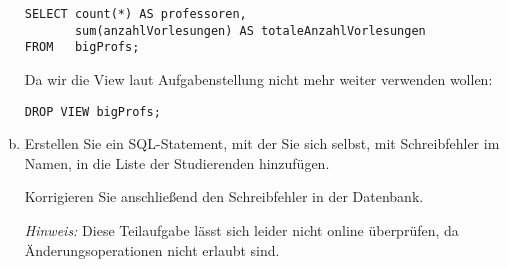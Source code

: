 \begin{normalText}
\begin{enumerate}[a)]
\begin{note}
	\begin{lstlisting}
SELECT count(*) AS professoren,
       sum(anzahlVorlesungen) AS totaleAnzahlVorlesungen
FROM   bigProfs;
	\end{lstlisting}

	Da wir die View laut Aufgabenstellung nicht mehr weiter verwenden wollen:

	\begin{lstlisting}
DROP VIEW bigProfs;
	\end{lstlisting}
	\end{note}



%
%

	\item Erstellen Sie ein SQL-Statement, mit der Sie sich selbst, mit 
	Schreibfehler im Namen, in die Liste der Studierenden hinzufügen.

	Korrigieren Sie anschließend den Schreibfehler in der Datenbank.

	\textit{Hinweis:} Diese Teilaufgabe lässt sich leider nicht online überprüfen, da Änderungsoperationen nicht erlaubt sind.


\end{enumerate}
\end{normalText}
